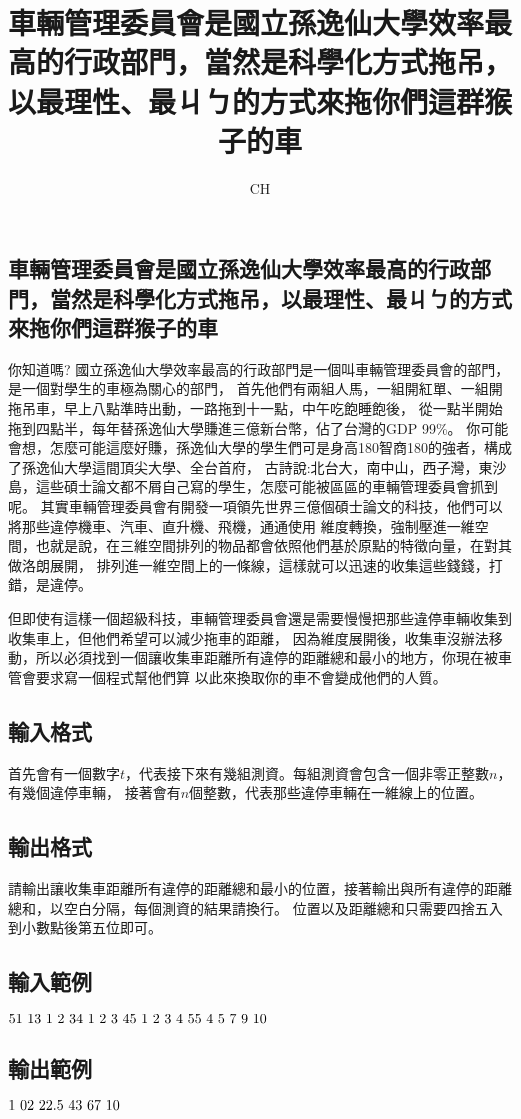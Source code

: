 \documentclass{article}
\title{車輛管理委員會是國立孫逸仙大學效率最高的行政部門，當然是科學化方式拖吊，以最理性、最ㄐㄅ的方式來拖你們這群猴子的車}
\author{CH}
\begin{document}
\begin{CJK*}{UTF8}{bsmi}

\maketitle

\section*{車輛管理委員會是國立孫逸仙大學效率最高的行政部門，當然是科學化方式拖吊，以最理性、最ㄐㄅ的方式來拖你們這群猴子的車}

你知道嗎? 國立孫逸仙大學效率最高的行政部門是一個叫車輛管理委員會的部門，是一個對學生的車極為關心的部門，
首先他們有兩組人馬，一組開紅單、一組開拖吊車，早上八點準時出動，一路拖到十一點，中午吃飽睡飽後，
從一點半開始拖到四點半，每年替孫逸仙大學賺進三億新台幣，佔了台灣的GDP 99\%。
你可能會想，怎麼可能這麼好賺，孫逸仙大學的學生們可是身高180智商180的強者，構成了孫逸仙大學這間頂尖大學、全台首府，
古詩說:北台大，南中山，西子灣，東沙島，這些碩士論文都不屑自己寫的學生，怎麼可能被區區的車輛管理委員會抓到呢。
其實車輛管理委員會有開發一項領先世界三億個碩士論文的科技，他們可以將那些違停機車、汽車、直升機、飛機，通通使用
維度轉換，強制壓進一維空間，也就是說，在三維空間排列的物品都會依照他們基於原點的特徵向量，在對其做洛朗展開，
排列進一維空間上的一條線，這樣就可以迅速的收集這些錢錢，打錯，是違停。

但即使有這樣一個超級科技，車輛管理委員會還是需要慢慢把那些違停車輛收集到收集車上，但他們希望可以減少拖車的距離，
因為維度展開後，收集車沒辦法移動，所以必須找到一個讓收集車距離所有違停的距離總和最小的地方，你現在被車管會要求寫一個程式幫他們算
以此來換取你的車不會變成他們的人質。

\subsection*{輸入格式}
首先會有一個數字$t$，代表接下來有幾組測資。每組測資會包含一個非零正整數$n$，有幾個違停車輛，
接著會有$n$個整數，代表那些違停車輛在一維線上的位置。

\subsection*{輸出格式}
請輸出讓收集車距離所有違停的距離總和最小的位置，接著輸出與所有違停的距離總和，以空白分隔，每個測資的結果請換行。
位置以及距離總和只需要四捨五入到小數點後第五位即可。

\subsection*{輸入範例}
$5\\1\ 1\\3\ 1\ 2\ 3\\4\ 1\ 2\ 3\ 4\\5\ 1\ 2\ 3\ 4\ 5\\5\ 4\ 5\ 7\ 9\ 10$

\subsection*{輸出範例}
$1\ 0\\2\ 2\\2.5\ 4\\3\ 6\\7\ 10$

\end{CJK*}
\end{document}

